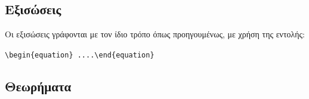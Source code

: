 \newpage


\subsection{Εξισώσεις}
\label{subsec:Equations}

Οι εξισώσεις γράφονται με τον ίδιο τρόπο όπως προηγουμένως, με
χρήση της εντολής:

\chl \bs \s\s

\verb"\begin{equation} ....\end{equation}"

\subsection{Θεωρήματα}
\label{subsec:Theorems}

